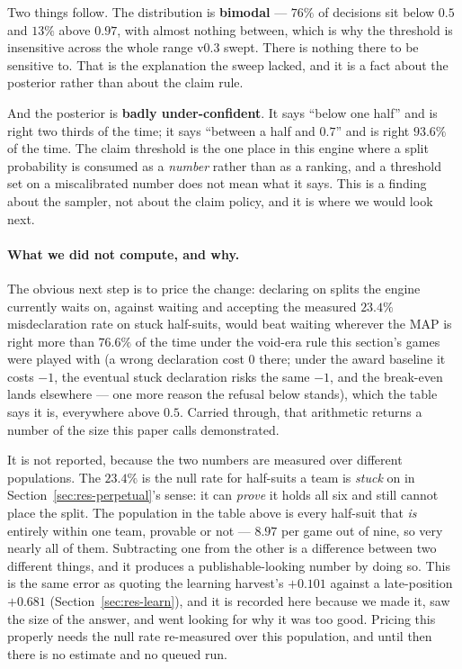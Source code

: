 \documentclass[11pt,letterpaper]{article}
\begin{document}
Two things follow. The distribution is \textbf{bimodal} --- $76\%$ of decisions
sit below $0.5$ and $13\%$ above $0.97$, with almost nothing between, which is
why the threshold is insensitive across the whole range v0.3 swept. There is
nothing there to be sensitive to. That is the explanation the sweep lacked, and
it is a fact about the posterior rather than about the claim rule.

And the posterior is \textbf{badly under-confident}. It says ``below one half''
and is right two thirds of the time; it says ``between a half and $0.7$'' and is
right $93.6\%$ of the time. The claim threshold is the one place in this engine
where a split probability is consumed as a \emph{number} rather than as a
ranking, and a threshold set on a miscalibrated number does not mean what it
says. This is a finding about the sampler, not about the claim policy, and it is
where we would look next.

\paragraph{What we did not compute, and why.} The obvious next step is to price
the change: declaring on splits the engine currently waits on, against waiting
and accepting the measured $23.4\%$ misdeclaration rate on stuck half-suits,
would beat waiting wherever the MAP is right more than $76.6\%$ of the time
under the void-era rule this section's games were played with (a wrong
declaration cost $0$ there; under the award baseline it costs $-1$, the
eventual stuck declaration risks the same $-1$, and the break-even lands
elsewhere --- one more reason the refusal below stands), which the
table says it is, everywhere above $0.5$. Carried through, that arithmetic
returns a number of the size this paper calls demonstrated.

It is not reported, because the two numbers are measured over different
populations. The $23.4\%$ is the null rate for half-suits a team is
\emph{stuck} on in Section~\ref{sec:res-perpetual}'s sense: it can \emph{prove}
it holds all six and still cannot place the split. The population in the table
above is every half-suit that \emph{is} entirely within one team, provable or
not --- $8.97$ per game out of nine, so very nearly all of them. Subtracting one
from the other is a difference between two different things, and it produces a
publishable-looking number by doing so. This is the same error as quoting the
learning harvest's $+0.101$ against a late-position $+0.681$
(Section~\ref{sec:res-learn}), and it is recorded here because we made it, saw
the size of the answer, and went looking for why it was too good. Pricing this
properly needs the null rate re-measured over this population, and until then
there is no estimate and no queued run.
\end{document}

